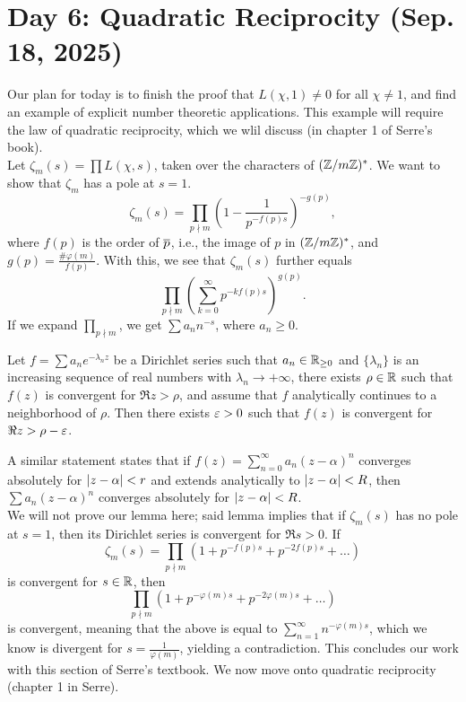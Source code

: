 \section{Day 6: Quadratic Reciprocity (Sep. 18, 2025)}
Our plan for today is to finish the proof that $L(\chi, 1) \neq 0$ for all $\chi \neq 1$, and find an example of explicit number theoretic applications. This example will require the law of quadratic reciprocity, which we wlil discuss (in chapter 1 of Serre's book).
\\[8pt]
Let $\zeta_m(s) = \prod L(\chi, s)$, taken over the characters of $(\mathbb Z/m\mathbb Z)^\ast$. We want to show that $\zeta_m$ has a pole at $s=1$.
\[ \zeta_m(s) = \prod_{p \nmid m} \left(1 - \frac{1}{p^{-f(p)s}}\right)^{-g(p)}, \]
where $f(p)$ is the order of $\overline p$, i.e., the image of $p$ in $(\mathbb Z/m\mathbb Z)^\ast$, and $g(p) = \frac{\#\varphi(m)}{f(p)}$. With this, we see that $\zeta_m(s)$ further equals
\[ \prod_{p \nmid m} \left(\sum_{k=0}^\infty p^{-k f(p) s}\right)^{g(p)}. \]
If we expand $\prod_{p \nmid m}$, we get $\sum a_n n^{-s}$, where $a_n \geq 0$.
\begin{lemma}
Let $f = \sum a_n e^{- \lambda_n z}$ be a Dirichlet series such that $a_n \in \mathbb R_{\geq 0}$ and $\{\lambda_n\}$ is an increasing sequence of real numbers with $\lambda_n \to +\infty$, there exists $\rho \in \mathbb R$ such that $f(z)$ is convergent for $\Re z > \rho$, and assume that $f$ analytically continues to a neighborhood of $\rho$. Then there exists $\varepsilon > 0$ such that $f(z)$ is convergent for $\Re z > \rho - \varepsilon$.
\end{lemma}
\noindent A similar statement states that if $f(z) = \sum_{n=0}^\infty a_n (z - \alpha)^n$ converges absolutely for $\left\lvert z - \alpha \right\rvert < r$ and extends analytically to $\left\lvert z - \alpha \right\rvert < R$, then $\sum a_n (z - \alpha)^n$ converges absolutely for $\left\lvert z - \alpha \right\rvert < R$.
\\[8pt]
We will not prove our lemma here; said lemma implies that if $\zeta_m(s)$ has no pole at $s = 1$, then its Dirichlet series is convergent for $\Re s > 0$. If
\[ \zeta_m(s) = \prod_{p \nmid m} \left(1 + p^{-f(p)s} + p^{-2f(p)s} + \dots\right) \]
is convergent for $s \in \mathbb R$, then
\[ \prod_{p \nmid m} \left(1 + p^{-\varphi(m)s} + p^{-2 \varphi(m)s} + \dots\right) \]
is convergent, meaning that the above is equal to $\sum_{n=1}^\infty n^{-\varphi(m) s}$, which we know is divergent for $s = \frac{1}{\varphi(m)}$, yielding a contradiction. This concludes our work with this section of Serre's textbook.
\hrulebar
\noindent We now move onto quadratic reciprocity (chapter 1 in Serre).

